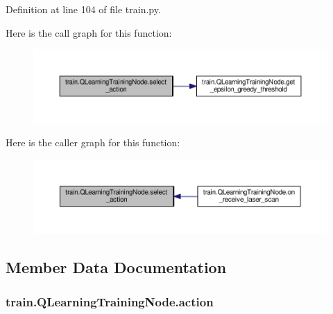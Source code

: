 Definition at line 104 of file train.\+py.



Here is the call graph for this function\+:
\nopagebreak
\begin{figure}[H]
\begin{center}
\leavevmode
\includegraphics[width=350pt]{classtrain_1_1_q_learning_training_node_ac03f4ced7d65ef3c2cf36978796fcfda_cgraph}
\end{center}
\end{figure}




Here is the caller graph for this function\+:
\nopagebreak
\begin{figure}[H]
\begin{center}
\leavevmode
\includegraphics[width=350pt]{classtrain_1_1_q_learning_training_node_ac03f4ced7d65ef3c2cf36978796fcfda_icgraph}
\end{center}
\end{figure}




\subsection{Member Data Documentation}
\subsubsection[{\texorpdfstring{action}{action}}]{\setlength{\rightskip}{0pt plus 5cm}train.\+Q\+Learning\+Training\+Node.\+action}\hypertarget{classtrain_1_1_q_learning_training_node_ad42c35a16230d89d787b5a3a74808edf}{}\label{classtrain_1_1_q_learning_training_node_ad42c35a16230d89d787b5a3a74808edf}


